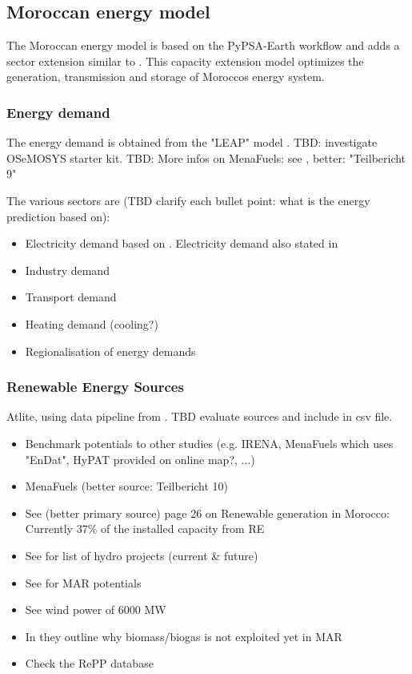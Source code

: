 \subsection{Moroccan energy model}
\label{subsec:moroccan_model}
The Moroccan energy model is based on the PyPSA-Earth workflow \cite{Parzen2022} and 
adds a sector extension similar to \cite{Brown2018a}.
This capacity extension model optimizes the generation, transmission and storage of Moroccos energy system.


\subsubsection{Energy demand}
The energy demand is obtained from the "LEAP" model \cite{Heaps2022}.
TBD: investigate OSeMOSYS starter kit.
TBD: More infos on MenaFuels: see \cite[p. 35]{Ersoy2022}, better: "Teilbericht 9"

The various sectors are (TBD clarify each bullet point: what is the energy prediction based on):
\begin{itemize}
    \item Electricity demand based on \cite{Parzen2022}. Electricity demand also stated in \cite[primary source 25]{Boulakhbar2020}
    \item Industry demand
    \item Transport demand
    \item Heating demand (cooling?) 
    \item Regionalisation of energy demands
\end{itemize}



\subsubsection{Renewable Energy Sources}
Atlite, using data pipeline from \cite{Parzen2022}. TBD evaluate sources and include in csv file.

\begin{itemize}
    \item Benchmark potentials to other studies (e.g. IRENA, MenaFuels which uses "EnDat", HyPAT provided on online map?, ...)
    \item MenaFuels \cite[p. 25]{Ersoy2022} (better source: Teilbericht 10)
    \item See \cite{Ersoy2022} (better primary source) page 26 on Renewable generation in Morocco: Currently 37\% of the installed capacity from RE
    \item See \cite[p. 5]{Boulakhbar2020} for list of hydro projects (current \& future)
    \item See \cite[primary 10,13,17]{Boulakhbar2020} for MAR potentials
    \item See \cite[primary 13, 38]{Boulakhbar2020} wind power of 6000 MW
    \item In \cite[p. 6]{Boulakhbar2020} they outline why biomass/biogas is not exploited yet in MAR
    \item Check the RePP database \cite{Peters2023}
\end{itemize}

